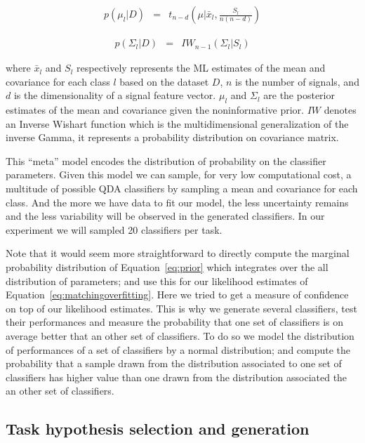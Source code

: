 \begin{eqnarray}
p(\mu_l|D) & = & t_{n-d}(\mu| \bar{x}_l, \frac{S_l}{n(n-d)})
\label{eq:jeffreysmean}
\end{eqnarray}

\begin{eqnarray}
p(\Sigma_l|D) & = & IW_{n-1}(\Sigma_l | S_l)
\label{eq:jeffreyscov}
\end{eqnarray}

where $\bar{x}_l$ and $S_l$ respectively represents the ML estimates of the mean and covariance for each class $l$ based on the dataset $D$, $n$ is the number of signals, and $d$ is the dimensionality of a signal feature vector.
$\mu_l$ and $\Sigma_l$ are the posterior estimates of the mean and covariance given the noninformative prior. $IW$ denotes an Inverse Wishart function which is the multidimensional generalization of the inverse Gamma, it represents a probability distribution on covariance matrix.

This ``meta'' model encodes the distribution of probability on the classifier parameters. Given this model we can sample, for very low computational cost, a multitude of possible QDA classifiers by sampling a mean and covariance for each class. And the more we have data to fit our model, the less uncertainty remains and the less variability will be observed in the generated classifiers. In our experiment we will sampled 20 classifiers per task.



Note that it would seem more straightforward to directly compute the marginal probability distribution of Equation~\ref{eq:prior} which integrates over the all distribution of parameters; and use this for our likelihood estimates of Equation~\ref{eq:matchingoverfitting}. Here we tried to get a measure of confidence on top of our likelihood estimates. This is why we generate several classifiers, test their performances and measure the probability that one set of classifiers is on average better that an other set of classifiers. To do so we model the distribution of performances of a set of classifiers by a normal distribution; and compute the probability that a sample drawn from the distribution associated to one set of classifiers has higher value than one drawn from the distribution associated the an other set of classifiers.

\subsection{Task hypothesis selection and generation}
\label{chapter:limitations:continoushypothesis:particlefilter}

